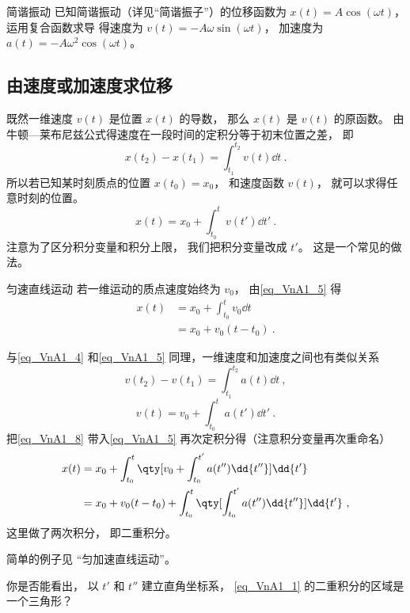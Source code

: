 \begin{example}{简谐振动}
已知简谐振动（详见“简谐振子”）的位移函数为 $x(t) = A\cos(\omega t)$， 运用复合函数求导 得速度为 $v(t) = -A\omega\sin(\omega t)$， 加速度为 $a(t) = -A\omega^2\cos(\omega t)$。
\end{example}

\subsection{由速度或加速度求位移}
既然一维速度 $v(t)$ 是位置 $x(t)$ 的导数， 那么 $x(t)$ 是 $v(t)$ 的原函数。 由牛顿—莱布尼兹公式得速度在一段时间的定积分等于初末位置之差， 即
\begin{equation}\label{eq_VnA1_4}
x(t_2) - x(t_1) = \int_{t_1}^{t_2} v(t) \dd{t}~.
\end{equation}
所以若已知某时刻质点的位置 $x(t_0) = x_0$， 和速度函数 $v(t)$， 就可以求得任意时刻的位置。
\begin{equation}\label{eq_VnA1_5}
x(t) = x_0 + \int_{t_0}^t v(t') \dd{t'}~.
\end{equation}
注意为了区分积分变量和积分上限， 我们把积分变量改成 $t'$。 这是一个常见的做法。

\begin{example}{匀速直线运动}
若一维运动的质点速度始终为 $v_0$， 由\autoref{eq_VnA1_5} 得
\begin{equation}
\begin{aligned}
x(t) &= x_0 + \int_{t_0}^t v_0 \dd{t}\\
&= x_0 + v_0(t-t_0)~.
\end{aligned}
\end{equation}
\end{example}

与\autoref{eq_VnA1_4} 和\autoref{eq_VnA1_5} 同理，一维速度和加速度之间也有类似关系
\begin{equation}
v(t_2) - v(t_1) = \int_{t_1}^{t_2} a(t) \dd{t}~,
\end{equation}
\begin{equation}\label{eq_VnA1_8}
v(t) = v_0 + \int_{t_0}^t a(t') \dd{t'}~.
\end{equation}
把\autoref{eq_VnA1_8} 带入\autoref{eq_VnA1_5} 再次定积分得（注意积分变量再次重命名）
\begin{equation}\label{eq_VnA1_2}
\begin{aligned}
x(t) &= x_0 + \int_{t_0}^t  \qty[v_0 + \int_{t_0}^{t'} a(t'') \dd{t''}] \dd{t'}\\
&= x_0 + v_0 (t - t_0) + \int_{t_0}^t \qty[\int_{t_0}^{t'} a(t'') \dd{t''}] \dd{t'}~,\\
\end{aligned}
\end{equation}
这里做了两次积分， 即二重积分。

简单的例子见 “匀加速直线运动”。

\begin{exercise}{}
你是否能看出， 以 $t'$ 和 $t''$ 建立直角坐标系， \autoref{eq_VnA1_1} 的二重积分的区域是一个三角形？
\end{exercise}
